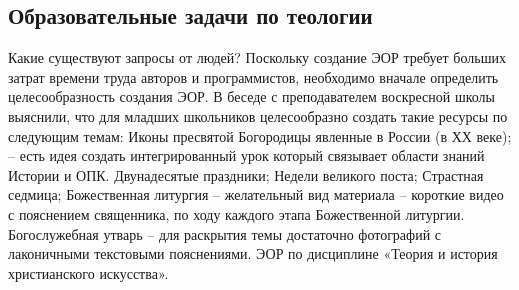 \subsection{Образовательные задачи по теологии}


Какие существуют запросы от людей?
Поскольку создание ЭОР требует больших затрат времени труда авторов и программистов, необходимо вначале определить целесообразность создания ЭОР. В беседе с преподавателем воскресной школы выяснили, что для младших школьников целесообразно создать такие ресурсы по следующим темам:
Иконы пресвятой Богородицы явленные в России (в ХХ веке); – есть идея создать интегрированный урок который связывает области знаний Истории и ОПК.
Двунадесятые праздники;
Недели великого поста;
Страстная седмица;
Божественная литургия – желательный вид материала – короткие видео с пояснением священника, по ходу каждого этапа Божественной литургии.
Богослужебная утварь – для раскрытия темы достаточно фотографий с лаконичными текстовыми пояснениями.
ЭОР по дисциплине «Теория и история христианского искусства».


